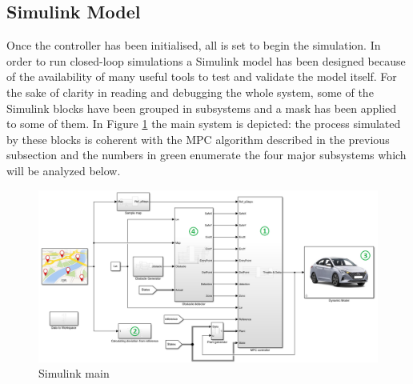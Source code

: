 \subsection{Simulink Model}

Once the controller has been initialised, all is set to begin the simulation.
In order to run closed-loop simulations a Simulink model has been designed because of the availability of many useful tools to test and validate the model itself. For the sake of clarity in reading and debugging the whole system, some of the Simulink blocks have been grouped in subsystems and a mask has been applied to some of them. 
In Figure \ref{fig:simulink_main} the main system is depicted: the process simulated by these blocks is coherent with the MPC algorithm described in the previous subsection and the numbers in green enumerate the four major subsystems which will be analyzed below.

\begin{figure}[H]
    \centering
    \includegraphics[width=\textwidth]{Figures/simulink_main.png}
    \caption{Simulink main}
    \label{fig:simulink_main}
\end{figure}


